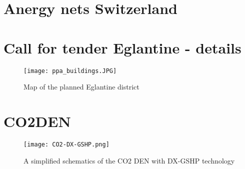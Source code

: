 \section{Anergy nets Switzerland}
\label{as:anergy_suisse}



\section{Call for tender Eglantine - details}
\label{as:eglantine}



\begin{figure}[htp]
	\centering
	\texttt{[image: ppa\_buildings.JPG]}
	\caption{Map of the planned Eglantine district}
	\label{fig:ppa_buildings}
\end{figure}

\section{CO2DEN}\label{as:co2den}
\begin{figure}[htp]
	\centering
	\texttt{[image: CO2-DX-GSHP.png]}
	\caption{A simplified schematics of the CO2 DEN with DX-GSHP technology}
	\label{fig:co2_gshp}
\end{figure}
